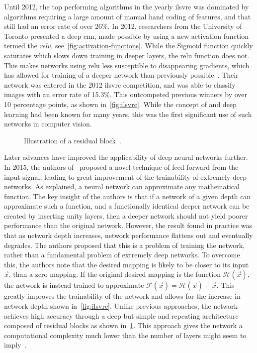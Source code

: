 \documentclass[\rootfolder/main.tex]{subfiles}
\begin{document}
Until 2012, the top performing algorithms in the yearly \acrfull{ilsvrc} was dominated by algorithms requiring a large amount of manual hand coding of features, and that still had an error rate of over 26\%.
In 2012, researchers from the University of Toronto presented a deep \acrshort{cnn}, made possible by using a new activation function termed the \emph{\acrfull{relu}}, see~\cref{fig:activation-functions}.
While the Sigmoid function quickly saturates which slows down training in deeper layers, the \acrshort{relu} function does not.
This makes networks using \acrshort{relu} less susceptible to disappearing gradients, which has allowed for training of a deeper network than previously possible~\cite{Krizhevsky2012}.
Their network was entered in the 2012 \acrshort{ilsvrc} competition, and was able to classify images with an error rate of 15.3\%.
This outcompeted previous winners by over 10 percentage points, as shown in~\cref{fig:ilsvrc}.
While the concept of  and deep learning had been known for many years, this was the first significant use of such networks in computer vision.

\begin{figure}
    \caption[Illustration of a residual block.]{Illustration of a residual block~\cite{He2016}.}
    \label{fig:residual-block}
\end{figure}

Later advances have improved the applicability of deep neural networks further.
In 2015, the authors of~\cite{He2016} proposed a novel technique of feed-forward from the input signal, leading to great improvement of the trainability of extremely deep networks.
As explained, a neural network can approximate any mathematical function.
The key insight of the authors is that if a network of a given depth can approximate such a function, and a functionally identical deeper network can be created by inserting unity layers, then a deeper network should not yield poorer performance than the original network.
However, the result found in practice was that as network depth increases, network performance flattens out and eventually degrades.
The authors proposed that this is a problem of training the network, rather than a fundamental problem of extremely deep networks.
To overcome this, the authors note that the desired mapping is likely to be closer to its input $\vec{x}$, than a zero mapping.
If the original desired mapping is the function $\mathcal{H}(\vec{x})$, the network is instead trained to approximate $\mathcal{F}(\vec{x}) = \mathcal{H}(\vec{x}) - \vec{x}$.
This greatly improves the trainability of the network and allows for the increase in network depth shown in~\cref{fig:ilsvrc}.
Unlike previous approaches, the network achieves high accuracy through a deep but simple and repeating architecture composed of residual blocks as shown in~\cref{fig:residual-block}.
This approach gives the network a computational complexity much lower than the number of layers might seem to imply~\cite{He2016}.
\end{document}
